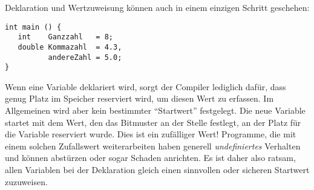 Deklaration und Wertzuweisung können auch in einem einzigen Schritt geschehen:
\begin{codebox}
\begin{verbatim}
int main () {
   int    Ganzzahl   = 8;
   double Kommazahl  = 4.3,
          andereZahl = 5.0;
}
\end{verbatim}
\end{codebox}

\begin{hintbox}
Wenn eine Variable deklariert wird, sorgt der Compiler lediglich dafür, dass genug Platz im Speicher reserviert wird, um diesen Wert zu erfassen. Im Allgemeinen wird aber kein bestimmter \enquote{Startwert} festgelegt. Die neue Variable startet mit dem Wert, den das Bitmuster an der Stelle festlegt, an der Platz für die Variable reserviert wurde. Dies ist ein zufälliger Wert! Programme, die mit einem solchen Zufallswert weiterarbeiten haben generell \emph{undefiniertes} Verhalten und können abstürzen oder sogar Schaden anrichten. Es ist daher also ratsam, allen Variablen bei der Deklaration gleich einen sinnvollen oder sicheren Startwert zuzuweisen.
\end{hintbox}

